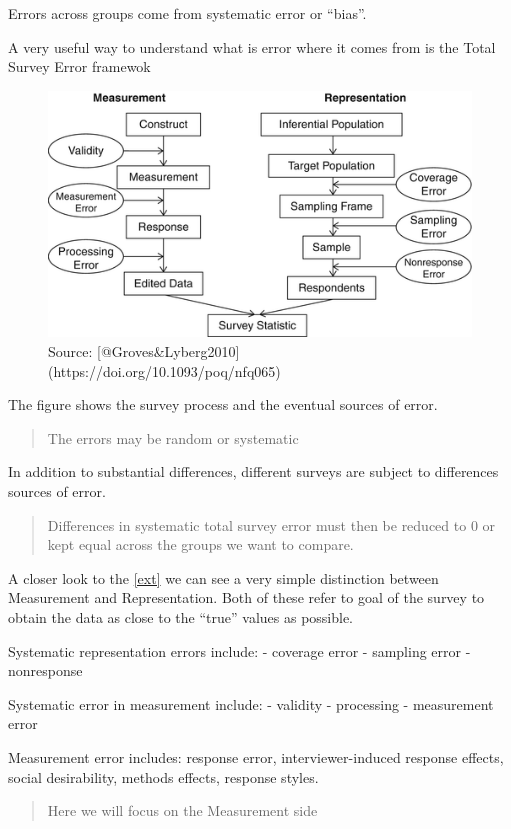 \documentclass[
]{book}
\begin{document}
Errors across groups come from systematic error or ``bias''.

A very useful way to understand what is error where it comes from is the Total Survey Error framewok

\begin{figure}
\includegraphics[width=0.8\linewidth]{total_survey_error} \caption{Source: [@Groves&Lyberg2010](https://doi.org/10.1093/poq/nfq065)}\label{fig:ext}
\end{figure}

The figure shows the survey process and the eventual sources of error.

\begin{quote}
The errors may be random or systematic
\end{quote}

In addition to substantial differences, different surveys are subject to differences sources of error.

\begin{quote}
Differences in systematic total survey error must then be reduced to 0 or kept equal across the groups we want to compare.
\end{quote}

A closer look to the \ref{ext} we can see a very simple distinction between Measurement and Representation. Both of these refer to goal of the survey to obtain the data as close to the ``true'' values as possible.

Systematic representation errors include:
- coverage error
- sampling error
- nonresponse

Systematic error in measurement include:
- validity
- processing
- measurement error

Measurement error includes: response error, interviewer-induced response effects, social desirability, methods effects, response styles.

\begin{quote}
Here we will focus on the Measurement side
\end{quote}
\end{document}
